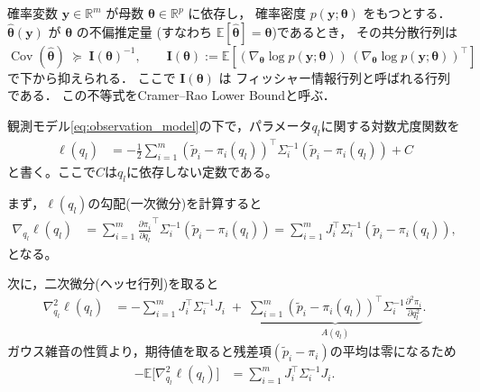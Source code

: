\begin{dfn}
確率変数 $\mathbf y\in\mathbb R^{m}$ が母数 $\boldsymbol\theta\in\mathbb R^{p}$ に依存し，
確率密度 $p(\mathbf y;\boldsymbol\theta)$ をもつとする．  
$\hat{\boldsymbol\theta}(\mathbf y)$ が $\boldsymbol\theta$ の不偏推定量
(すなわち $\mathbb E[\hat{\boldsymbol\theta}]=\boldsymbol\theta$)であるとき，
その共分散行列は
\[
    \operatorname{Cov}(\hat{\boldsymbol\theta})
    \;\succeq\;
    \mathbf I(\boldsymbol\theta)^{-1},
    \qquad
    \mathbf I(\boldsymbol\theta)
    :=\mathbb E\!\left[
        \left(\nabla_{\!\boldsymbol\theta}\!\log p(\mathbf y;\boldsymbol\theta)\right)
        \,\left(\nabla_{\!\boldsymbol\theta}\!\log p(\mathbf y;\boldsymbol\theta)\right)^{\!\top}
    \right]
\]
で下から抑えられる．  
ここで $\mathbf I(\boldsymbol\theta)$ は
フィッシャー情報行列と呼ばれる行列である．
この不等式をCramer--Rao Lower Boundと呼ぶ．
\end{dfn}

観測モデル\eqref{eq:observation_model}の下で，パラメータ$q_l$に関する対数尤度関数を
\begin{equation}
\begin{aligned}
\ell(q_l)
&= -\frac{1}{2}\sum_{i=1}^m
(\tilde p_i - \pi_i(q_l))^\top \Sigma_i^{-1}(\tilde p_i - \pi_i(q_l)) + C
\label{eq:loglikelihood_expanded}
\end{aligned}
\end{equation}
と書く。ここで$C$は$q_l$に依存しない定数である。

まず，$\ell(q_l)$の勾配(一次微分)を計算すると
\begin{equation}
\begin{aligned}
\nabla_{q_l}\ell(q_l)
&= \sum_{i=1}^m
\frac{\partial \pi_i}{\partial q_l}^\top
\Sigma_i^{-1}(\tilde p_i - \pi_i(q_l))
= \sum_{i=1}^m J_i^\top \Sigma_i^{-1}(\tilde p_i - \pi_i(q_l)),
\end{aligned}
\label{eq:grad_loglikelihood}
\end{equation}
となる。

次に，二次微分(ヘッセ行列)を取ると
\begin{equation}
\begin{aligned}
\nabla^2_{q_l}\ell(q_l)
&= -\sum_{i=1}^m
J_i^\top \Sigma_i^{-1} J_i
\;+\;\underbrace{\sum_{i=1}^m
(\tilde p_i - \pi_i(q_l))^\top
\Sigma_i^{-1}
\frac{\partial^2 \pi_i}{\partial q_l^2}}_{A(q_l)}.
\end{aligned}
\label{eq:hessian_loglikelihood}
\end{equation}
ガウス雑音の性質より，期待値を取ると残差項$(\tilde p_i - \pi_i)$の平均は零になるため
\begin{equation}
\begin{aligned}
-\mathbb{E}\bigl[\nabla^2_{q_l}\ell(q_l)\bigr]
&= \sum_{i=1}^m J_i^\top \Sigma_i^{-1} J_i.
\end{aligned}
\label{eq:FIM_derivation}
\end{equation}

